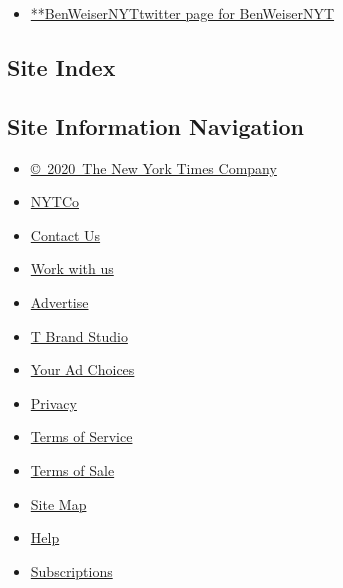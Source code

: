 \begin{itemize}
\tightlist
\item
  \href{https://twitter.com/BenWeiserNYT}{**BenWeiserNYTtwitter page for
  BenWeiserNYT}
\end{itemize}

\hypertarget{site-index}{%
\subsection{Site Index}\label{site-index}}

\hypertarget{site-information-navigation}{%
\subsection{Site Information
Navigation}\label{site-information-navigation}}

\begin{itemize}
\tightlist
\item
  \href{https://help.nytimes.com/hc/en-us/articles/115014792127-Copyright-notice}{©~2020~The
  New York Times Company}
\end{itemize}

\begin{itemize}
\tightlist
\item
  \href{https://www.nytco.com/}{NYTCo}
\item
  \href{https://help.nytimes.com/hc/en-us/articles/115015385887-Contact-Us}{Contact
  Us}
\item
  \href{https://www.nytco.com/careers/}{Work with us}
\item
  \href{https://nytmediakit.com/}{Advertise}
\item
  \href{http://www.tbrandstudio.com/}{T Brand Studio}
\item
  \href{https://www.nytimes.com/privacy/cookie-policy\#how-do-i-manage-trackers}{Your
  Ad Choices}
\item
  \href{https://www.nytimes.com/privacy}{Privacy}
\item
  \href{https://help.nytimes.com/hc/en-us/articles/115014893428-Terms-of-service}{Terms
  of Service}
\item
  \href{https://help.nytimes.com/hc/en-us/articles/115014893968-Terms-of-sale}{Terms
  of Sale}
\item
  \href{https://spiderbites.nytimes.com}{Site Map}
\item
  \href{https://help.nytimes.com/hc/en-us}{Help}
\item
  \href{https://www.nytimes.com/subscription?campaignId=37WXW}{Subscriptions}
\end{itemize}
